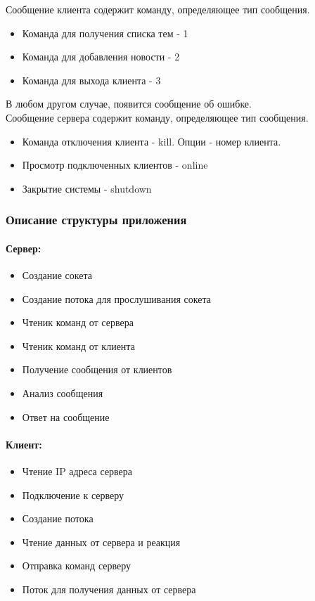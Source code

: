 Сообщение клиента  содержит команду, определяющее тип сообщения. 
\begin{itemize}
\item Команда для получения списка тем - 1
\item Команда для добавления новости - 2
\item Команда для выхода клиента - 3
\end{itemize}
В любом другом случае, появится сообщение об ошибке.\\

Сообщение сервера содержит команду, определяющее тип сообщения.
\begin{itemize}
\item Команда отключения клиента - kill. Опции - номер клиента.
\item Просмотр подключенных клиентов  - online
\item Закрытие системы - shutdown
\end{itemize}


\subsubsection{Описание структуры приложения}
\paragraph{Сервер:}
\begin{itemize}
\item Создание сокета
\item Создание потока для прослушивания сокета
\item Чтеник команд от сервера
\item Чтеник команд от клиента
\item Получение сообщения от клиентов
\item Анализ сообщения
\item Ответ на сообщение
\end{itemize}

\paragraph{Клиент:}
\begin{itemize}
\item Чтение IP адреса сервера
\item Подключение к серверу
\item Создание потока
\item Чтение данных от сервера и реакция
\item Отправка команд серверу
\item Поток для получения данных от сервера
\end{itemize}


